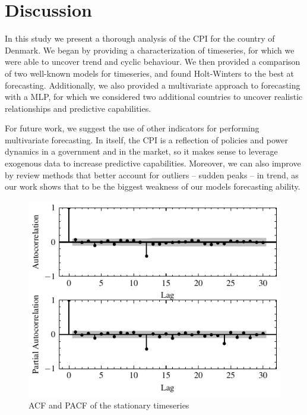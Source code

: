 \documentclass[conference]{IEEEtran}
\begin{document}
\section{Discussion}

In this study we present a thorough analysis of the CPI for the country of Denmark. We began by providing a characterization of timeseries, for which we were able to uncover trend and cyclic behaviour. We then provided a comparison of two well-known models for timeseries, and found Holt-Winters 
to the best at forecasting. Additionally, we also provided a multivariate approach to forecasting with a MLP, for which we considered two additional countries to uncover realistic relationships and predictive capabilities.

For future work, we suggest the use of other indicators for performing multivariate forecasting. In itself, the CPI is a reflection of policies and power dynamics in a government and in the market, so it makes sense to leverage exogenous data to increase predictive capabilities. Moreover, we can also improve by review methods that better account for outliers -- sudden peaks -- in trend, as our work shows that to be the biggest weakness of our models forecasting ability.

%
%

\appendix
\label{appendix:acf_pacf}

\begin{figure}[hbtp]
    \centering
    \includegraphics{../figs/acf_pacf.pdf}
    \caption{ACF and PACF of the stationary timeseries}
    \label{fig:acf_pacf}
\end{figure}
\end{document}
